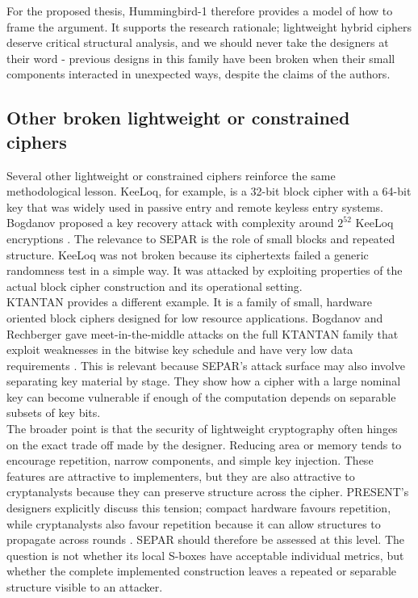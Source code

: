 \documentclass[11pt]{article}
\begin{document}
For the proposed thesis, Hummingbird-1 therefore provides a model of how to frame the argument. It supports the research rationale; lightweight hybrid ciphers deserve critical structural analysis, and we should never take the designers at their word - previous designs in this family have been broken when their small components interacted in unexpected ways, despite the claims of the authors.

\subsection{Other broken lightweight or constrained ciphers}

Several other lightweight or constrained ciphers reinforce the same methodological lesson. KeeLoq, for example, is a 32-bit block cipher with a 64-bit key that was widely used in passive entry and remote keyless entry systems. Bogdanov proposed a key recovery attack with complexity around $2^{52}$ KeeLoq encryptions \cite{BogdanovKeeLoq2007}. The relevance to SEPAR is the role of small blocks and repeated structure. KeeLoq was not broken because its ciphertexts failed a generic randomness test in a simple way. It was attacked by exploiting properties of the actual block cipher construction and its operational setting.\\

KTANTAN provides a different example. It is a family of small, hardware oriented block ciphers designed for low resource applications. Bogdanov and Rechberger gave meet-in-the-middle attacks on the full KTANTAN family that exploit weaknesses in the bitwise key schedule and have very low data requirements \cite{BogdanovRechberger2010}. This is relevant because SEPAR's attack surface may also involve separating key material by stage. They show how a cipher with a large nominal key can become vulnerable if enough of the computation depends on separable subsets of key bits.\\

The broader point is that the security of lightweight cryptography often hinges on the exact trade off made by the designer. Reducing area or memory tends to encourage repetition, narrow components, and simple key injection. These features are attractive to implementers, but they are also attractive to cryptanalysts because they can preserve structure across the cipher. PRESENT's designers explicitly discuss this tension; compact hardware favours repetition, while cryptanalysts also favour repetition because it can allow structures to propagate across rounds \cite{Bogdanov2007}. SEPAR should therefore be assessed at this level. The question is not whether its local S-boxes have acceptable individual metrics, but whether the complete implemented construction leaves a repeated or separable structure visible to an attacker.
\end{document}
